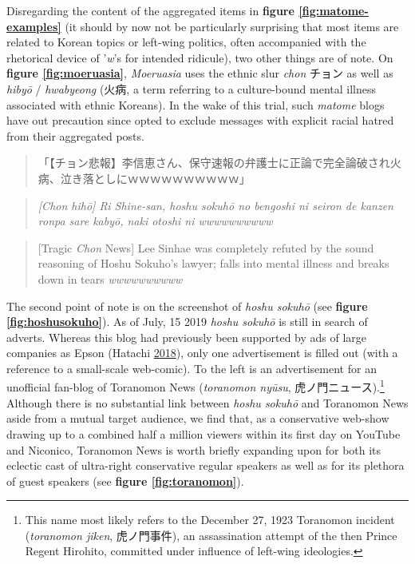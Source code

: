 \documentclass[10pt,british,A4paper,oneside]{memoir}
\begin{document}
Disregarding the content of the aggregated items in \textbf{figure
\ref{fig:matome-examples}} (it should by now not be particularly
surprising that most items are related to Korean topics or left-wing
politics, often accompanied with the rhetorical device of '\emph{w}'s
for intended ridicule), two other things are of note. On \textbf{figure
\ref{fig:moeruasia}}, \emph{Moeruasia} uses the ethnic slur \emph{chon}
チョン as well as \emph{hibyō} / \emph{hwabyeong} (火病, a term
referring to a culture-bound mental illness associated with ethnic Koreans). In the wake of this trial,
such \emph{matome} blogs have out precaution since opted to exclude
messages with explicit racial hatred from their aggregated posts.

\begin{quote}
「【チョン悲報】李信恵さん、保守速報の弁護士に正論で完全論破され火病、泣き落としにｗｗｗｗｗｗｗｗｗｗ」
\end{quote}

\begin{quote}
\emph{{[}Chon hihō{]} Ri Shine-san, hoshu sokuhō no bengoshi ni seiron
de kanzen ronpa sare kabyō, naki otoshi ni wwwwwwwwww}
\end{quote}

\begin{quote}
{[}Tragic \emph{Chon} News{]} Lee Sinhae was completely refuted by the
sound reasoning of Hoshu Sokuho's lawyer; falls into mental illness and
breaks down in tears \emph{wwwwwwwwww}
\end{quote}

The second point of note is on the screenshot of \emph{hoshu sokuhō}
(see \textbf{figure \ref{fig:hoshusokuho}}). As of July, 15 2019
\emph{hoshu sokuhō} is still in search of adverts. Whereas this blog had
previously been supported by ads of large companies as Epson (Hatachi
\protect\hyperlink{ref-hatachi__2018}{2018}), only one advertisement is
filled out (with a reference to a small-scale web-comic). To the left is
an advertisement for an unofficial fan-blog of Toranomon News
(\emph{toranomon nyūsu}, 虎ノ門ニュース).\footnote{This name most likely
  refers to the December 27, 1923 Toranomon incident (\emph{toranomon
  jiken}, 虎ノ門事件), an assassination attempt of the then Prince
  Regent Hirohito, committed under influence of left-wing ideologies.}
Although there is no substantial link between \emph{hoshu sokuhō} and
Toranomon News aside from a mutual target audience, we find that, as a
conservative web-show drawing up to a combined half a million viewers
within its first day on YouTube and Niconico, Toranomon News is worth
briefly expanding upon for both its eclectic cast of ultra-right
conservative regular speakers as well as for its plethora of guest
speakers (see \textbf{figure \ref{fig:toranomon}}).
\end{document}
